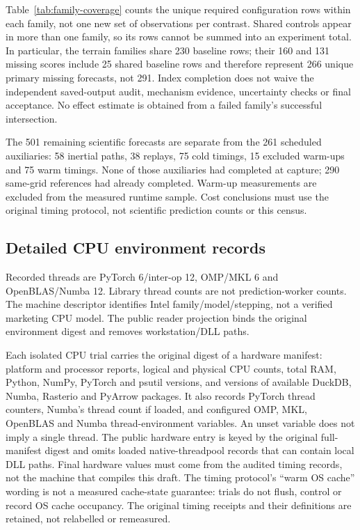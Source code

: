 \documentclass[11pt]{article}
\begin{document}
Table~\ref{tab:family-coverage} counts the unique required configuration rows
within each family, not one new set of observations per contrast. Shared
controls appear in more than one family, so its rows cannot be summed into
an experiment total. In particular, the terrain families share 230 baseline
rows; their 160 and 131 missing scores include 25 shared baseline rows and
therefore represent 266 unique primary missing forecasts, not 291.
Index completion does not waive the independent saved-output audit,
mechanism evidence, uncertainty checks or final acceptance. No effect
estimate is obtained from a failed family's successful intersection.

The 501 remaining scientific forecasts are separate from the 261 scheduled
auxiliaries: 58 inertial paths, 38 replays, 75 cold timings, 15 excluded
warm-ups and 75 warm timings. None of those auxiliaries had completed at
capture; 290 same-grid references had already completed. Warm-up measurements
are excluded from the measured runtime sample. Cost conclusions must use
the original timing protocol, not scientific prediction counts or this census.



\Needspace{.70\textheight}

\Needspace{.70\textheight}


\subsection{Detailed CPU environment records}
\label{sec:runtime-record-details}
Recorded threads are PyTorch 6/inter-op 12, OMP/MKL 6 and OpenBLAS/Numba 12.
Library thread counts are not prediction-worker counts. The machine descriptor
identifies Intel family/model/stepping, not a verified marketing CPU model.
The public reader projection binds the original environment digest and removes
workstation/DLL paths.

Each isolated CPU trial carries the original digest of a hardware manifest:
platform and processor reports, logical and physical CPU counts, total RAM,
Python, NumPy, PyTorch and psutil versions, and versions of available DuckDB,
Numba, Rasterio and PyArrow packages. It also records PyTorch thread counters,
Numba's thread count if loaded, and configured OMP, MKL, OpenBLAS and Numba
thread-environment variables. An unset variable does not imply a single thread.
The public hardware entry is keyed by the original full-manifest digest and
omits loaded native-threadpool records that can contain local DLL paths.
Final hardware values must come from the audited timing records, not the
machine that compiles this draft. The timing protocol's ``warm OS cache''
wording is not a measured cache-state guarantee: trials do not flush,
control or record OS cache occupancy. The original timing receipts and
their definitions are retained, not relabelled or remeasured.
\end{document}
